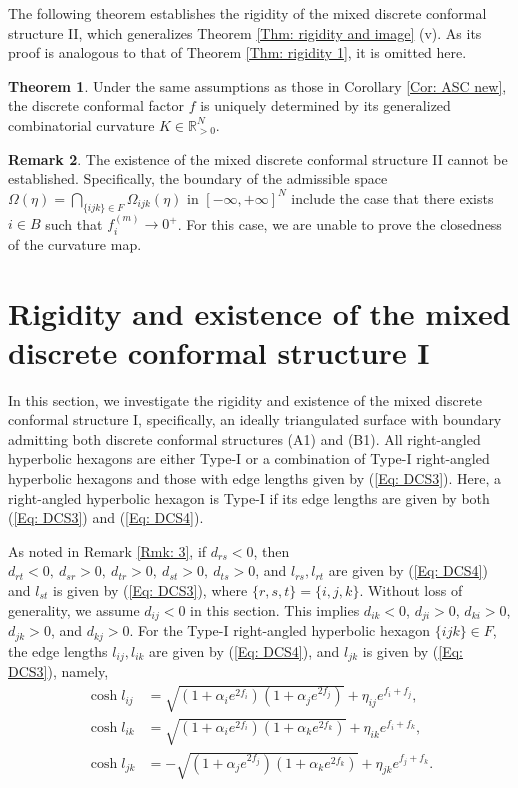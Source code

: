 \documentclass[12pt]{amsart}
\theoremstyle{definition}
\newtheorem{theorem}{Theorem}[section]
\newtheorem{remark}[theorem]{Remark}
\begin{document}
The following theorem establishes the rigidity of the mixed discrete conformal structure II,
which generalizes Theorem \ref{Thm: rigidity and image} (v).
As its proof is analogous to that of Theorem \ref{Thm: rigidity 1}, it is omitted here.

\begin{theorem}\label{Thm: Rigidity II}
Under the same assumptions as those in Corollary \ref{Cor: ASC new},
the discrete conformal factor $f$ is uniquely determined by its generalized combinatorial curvature $K\in \mathbb{R}^N_{>0}$.
\end{theorem}

\begin{remark}\label{Rmk: 6}
The existence of the mixed discrete conformal structure II cannot be established. 
Specifically, the boundary of the admissible space $\Omega(\eta)=\bigcap_{\{ijk\}\in F}\Omega_{ijk}(\eta)$ in $[-\infty,+\infty]^N$ include the case that
there exists $i\in B$ such that $f_i^{(m)}\rightarrow 0^+$.
For this case, we are unable to prove the closedness of the curvature map.
\end{remark}

\section{Rigidity and existence of the mixed discrete conformal structure I}\label{section I}

In this section, we investigate the rigidity and existence of the mixed discrete conformal structure I, specifically, an ideally triangulated surface with boundary admitting both discrete conformal structures (A1) and (B1). 
All right-angled hyperbolic hexagons are either Type-I or a combination of Type-I right-angled hyperbolic hexagons and those with edge lengths given by (\ref{Eq: DCS3}).
Here, a right-angled hyperbolic hexagon is Type-I if its edge lengths are given by both (\ref{Eq: DCS3}) and (\ref{Eq: DCS4}).

As noted in Remark \ref{Rmk: 3},
if $d_{rs}<0$, then $d_{rt}<0,\ d_{sr}>0,\ d_{tr}>0,\ d_{st}>0,\ d_{ts}>0$,
and $l_{rs}, l_{rt}$ are given by (\ref{Eq: DCS4}) and $l_{st}$ is given by (\ref{Eq: DCS3}),
where $\{r,s,t\}=\{i,j,k\}$.
Without loss of generality, we assume $d_{ij}<0$ in this section.
This implies $d_{ik}<0$, $d_{ji}>0$, $d_{ki}>0$, $d_{jk}>0$, and $d_{kj}>0$.
For the Type-I right-angled hyperbolic hexagon $\{ijk\}\in F$, the edge lengths $l_{ij},l_{ik}$ are given by (\ref{Eq: DCS4}), and $l_{jk}$ is given by (\ref{Eq: DCS3}), namely,
\begin{equation}\label{Eq: F38}
\begin{aligned}
\cosh l_{ij}
&=\sqrt{(1+\alpha_ie^{2f_i})(1+\alpha_je^{2f_j})}
+\eta_{ij}e^{f_i+f_j},\\
\cosh l_{ik}
&=\sqrt{(1+\alpha_ie^{2f_i})(1+\alpha_ke^{2f_k})}
+\eta_{ik}e^{f_i+f_k},\\
\cosh l_{jk}
&=-\sqrt{(1+\alpha_je^{2f_j})(1+\alpha_ke^{2f_k})}
+\eta_{jk}e^{f_j+f_k}.
\end{aligned}
\end{equation}
\end{document}
